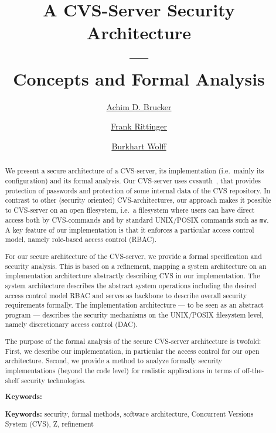 \documentclass[final,index,idxtotoc,fleqn,USenglish,pdftex,twoside,a4paper,bibtotoc,abstracton,headsepline,openright]{scrreprt}
\title{A CVS-Server Security Architecture \\ --- \\ Concepts and Formal Analysis}
\author{\href{http://www.brucker.ch}{Achim D. Brucker}
  \and 
  \href{http://www.informatik.uni-freiburg.de/~rittinge}{Frank Rittinger}
  \and 
  \href{http://www.informatik.uni-freiburg.de/~wolff}{Burkhart Wolff}
}
\makeatletter
\newcommand{\unixcmd}[1]{\texttt{#1}\index{#1@\textsf{#1}}}    %
\makeatother
\begin{document}
\pagestyle{empty}
\maketitle 
\begin{abstract}
  We present a secure architecture of a CVS-server, its implementation (i.e.\ 
  mainly its configuration) and its formal analysis. Our CVS-server uses
  cvsauth~\cite{vogt:cvsauth:2001}, that provides protection of passwords and
  protection of some internal data of the CVS repository. In contrast to other
  (security oriented) CVS-architectures, our approach makes it possible to
  CVS-server on an open filesystem, i.e.\ a filesystem where users can have
  direct access both by CVS-commands and by standard UNIX/POSIX commands such as
  \unixcmd{mv}. A key feature of our implementation is that it enforces a
  particular access control model, namely role-based access control (RBAC).
  
  For our secure architecture of the CVS-server, we provide a formal
  specification and security analysis. This is based on a refinement, mapping a
  system architecture on an implementation architecture abstractly describing
  CVS in our implementation. The system architecture describes the abstract
  system operations including the desired access control model RBAC and serves
  as backbone to describe overall security requirements formally. The
  implementation architecture --- to be seen as an abstract program ---
  describes the security mechanisms on the UNIX/POSIX filesystem level, namely
  discretionary access control (DAC).
 
  The purpose of the formal analysis of the secure CVS-server architecture is
  twofold: First, we describe our implementation, in particular the access
  control for our open architecture. Second, we provide a method to analyze
  formally security implementations (beyond the code level) for realistic
  applications in terms of off-the-shelf security technologies.
  
  \begin{labeling}{\textbf{Keywords:}}
    \item[\textbf{Keywords:}] security, formal methods, software architecture, 
                              Concurrent Versions System (CVS), Z, refinement 
  \end{labeling}
\end{abstract}
\tableofcontents 
{}
\pagestyle{headings}
\end{document}
